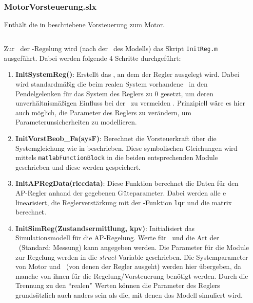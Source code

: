 \subsubsection{MotorVorsteuerung.slx}
Enthält die in  beschriebene Vorsteuerung zum Motor.


\subsection{\init}

Zur \init\ der \ap-Regelung wird (nach der \init\ des Modells) das Skript \texttt{InitReg.m} ausgeführt.
Dabei werden folgende 4 Schritte durchgeführt:
\begin{enumerate}
	\item \textbf{InitSystemReg()}: Erstellt das \zrm, an dem der Regler ausgelegt wird. Dabei wird standardmäßig die beim realen System vorhandene \crb\ in den Pendelgelenken für das System des Reglers zu 0 gesetzt, um deren unverhältnismäßigen Einfluss bei der \lin\ zu vermeiden . Prinzipiell wäre es hier auch möglich, die Parameter des Reglers zu verändern, um Parameterunsicherheiten zu modellieren.
	\item \textbf{InitVorstBeob\_Fa(sysF)}: Berechnet die Vorsteuerkraft über die Systemgleichung wie in  beschrieben. Diese symbolischen Gleichungen wird mittels \texttt{matlabFunctionBlock} in die beiden entsprechenden Module geschrieben und diese werden gespeichert. 
	\item \textbf{InitAPRegData(riccdata)}: Diese Funktion berechnet die Daten für den AP-Regler anhand der gegebenen Güteparameter. Dabei werden alle \ap e linearisiert, die Reglerverstärkung mit der \ml-Funktion \texttt{lqr} und die \beob matrix berechnet.
	\item \textbf{InitSimReg(Zustandsermittlung, kpv)}: Initialisiert das Simulationsmodell für die AP-Regelung. Werte für \kpv\ und die Art der \ze\ (Standard: Messung) kann angegeben werden. Die Parameter für die Module zur Regelung werden in die \emph{struct}-Variable  geschrieben. Die Systemparameter von Motor und \spd\ (von denen der Regler ausgeht) werden hier übergeben, da manche von ihnen für die Regelung/Vorsteuerung benötigt werden. Durch die Trennung zu den "`realen"' Werten  können die Parameter des Reglers grundsätzlich auch anders sein als die, mit denen das Modell simuliert wird.
\end{enumerate}



